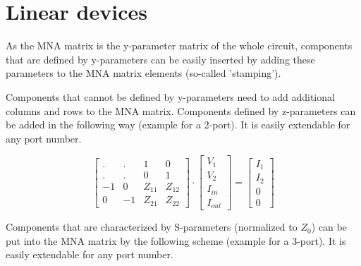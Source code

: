 %
%
%
%


\chapter{Linear devices}
\label{sec:Ldevices}

As the MNA matrix is the y-parameter matrix of the whole circuit,
components that are defined by y-parameters can be easily inserted
by adding these parameters to the MNA matrix elements (so-called
'stamping').

\addvspace{12pt}

Components that cannot be defined by y-parameters need to add
additional columns and rows to the MNA matrix. Components
defined by z-parameters can be added in the following way
(example for a 2-port). It is easily extendable for any port
number.

\begin{equation}
\begin{bmatrix}
 . & .  &  1 & 0\\
 . & .  &  0 & 1\\
-1 &  0 & Z_{11} & Z_{12}\\
 0 & -1 & Z_{21} & Z_{22}
\end{bmatrix}
\cdot
\begin{bmatrix}
V_{1}\\
V_{2}\\
I_{in}\\
I_{out}
\end{bmatrix}
=
\begin{bmatrix}
I_{1}\\
I_{2}\\
0\\
0
\end{bmatrix}
\end{equation}

Components that are characterized by S-parameters (normalized to $Z_0$)
can be put into the MNA matrix by the following scheme (example for a
3-port). It is easily extendable for any port number.

